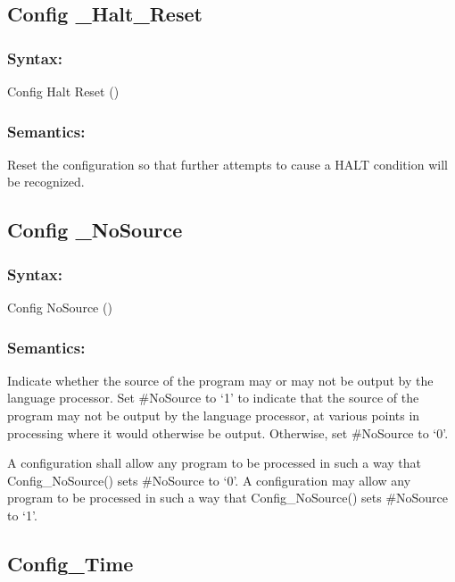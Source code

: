 \subsection{Config \_Halt\_Reset}\label{config-_halt_reset}

\subsubsection{Syntax:}\label{syntax-44}

Config Halt Reset ()

\subsubsection{Semantics:}\label{semantics-45}

Reset the configuration so that further attempts to cause a HALT
condition will be recognized.

\subsection{Config \_NoSource}\label{config-_nosource}

\subsubsection{Syntax:}\label{syntax-45}

Config NoSource ()

\subsubsection{Semantics:}\label{semantics-46}

Indicate whether the source of the program may or may not be output by
the language processor. Set \#NoSource to `1' to indicate that the
source of the program may not be output by the language processor, at
various points in processing where it would otherwise be output.
Otherwise, set \#NoSource to `0'.

A configuration shall allow any program to be processed in such a way
that Config\_NoSource() sets \#NoSource to `0'. A configuration may
allow any program to be processed in such a way that Config\_NoSource()
sets \#NoSource to `1'.

\subsection{Config\_Time}\label{config_time}

